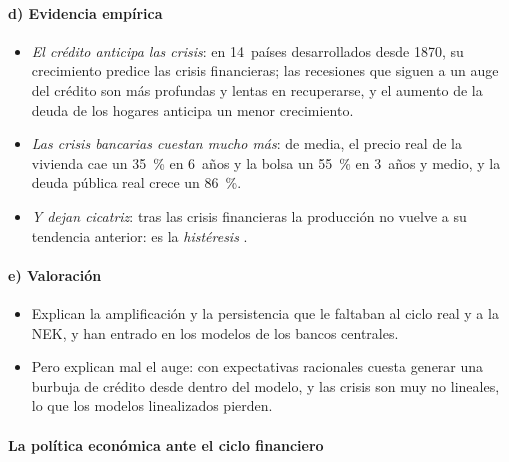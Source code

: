 \documentclass[11pt]{article}
\begin{document}
\paragraph{d) Evidencia empírica}

\begin{itemize}
\item \emph{El crédito anticipa las crisis}: en 14~países desarrollados desde 1870, su crecimiento predice las crisis financieras\nocite{SchularickTaylor2012Credit}; las recesiones que siguen a un auge del crédito son más profundas y lentas en recuperarse\nocite{JordaSchularickTaylor2013Credit,JordaSchularickTaylor2017Macrofinancial}, y el aumento de la deuda de los hogares anticipa un menor crecimiento\nocite{MianSufiVerner2017Household}.
\item \emph{Las crisis bancarias cuestan mucho más}: de media, el precio real de la vivienda cae un 35~\% en 6~años y la bolsa un 55~\% en 3~años y medio, y la deuda pública real crece un 86~\%\nocite{ReinhartRogoff2009Aftermath,ReinhartRogoff2009This}.
\item \emph{Y dejan cicatriz}: tras las crisis financieras la producción no vuelve a su tendencia anterior\nocite{CerraSaxena2008Growth}: es la \emph{histéresis} .
\end{itemize}

\paragraph{e) Valoración}

\begin{itemize}
\item Explican la amplificación y la persistencia que le faltaban al ciclo real y a la NEK, y han entrado en los modelos de los bancos centrales.
\item Pero explican mal el auge: con expectativas racionales cuesta generar una burbuja de crédito desde dentro del modelo, y las crisis son muy no lineales, lo que los modelos linealizados pierden.
\end{itemize}

\paragraph{La política económica ante el ciclo financiero}
\end{document}
